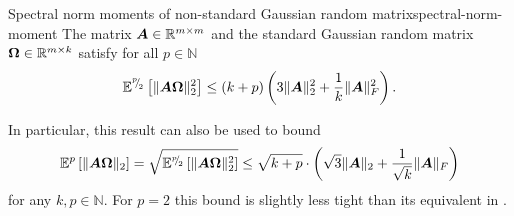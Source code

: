 \begin{lemma}{Spectral norm moments of non-standard Gaussian random matrix}{spectral-norm-moment}
    The matrix $\boldsymbol{A} \in \mathbb{R}^{m \times m}$ and the standard Gaussian random matrix $\boldsymbol{\Omega} \in \mathbb{R}^{m \times k}$ satisfy for all $p \in \mathbb{N}$ 
    \begin{equation}
        \mathbb{E}^{{}^{p}{\mskip -5mu/\mskip -3mu}_{2}}\left[ \lVert \boldsymbol{A} \boldsymbol{\Omega} \rVert _2^2 \right]
        \leq  (k + p) \left( 3 \lVert \boldsymbol{A} \rVert _2^2 + \frac{1}{k} \lVert \boldsymbol{A} \rVert _F^2 \right).
    \end{equation}
\end{lemma}

\begin{remark}
    In particular, this result can also be used to bound
    \begin{equation}
        \mathbb{E}^{p}\left[ \lVert \boldsymbol{A} \boldsymbol{\Omega} \rVert _2 \right] = \sqrt{\mathbb{E}^{{}^{p}{\mskip -5mu/\mskip -3mu}_{2}}\left[ \lVert \boldsymbol{A} \boldsymbol{\Omega} \rVert _2^2 \right]} \leq \sqrt{k + p} \cdot \left(\sqrt{3} \lVert \boldsymbol{A} \rVert _2 + \frac{1}{\sqrt{k}}\lVert \boldsymbol{A} \rVert _F\right)
    \end{equation}
    for any $k,p \in \mathbb{N}$. For $p=2$ this bound is slightly less tight than its equivalent in \cite[Lemma B.1]{tropp-2023-randomized-algorithms}.
\end{remark}

